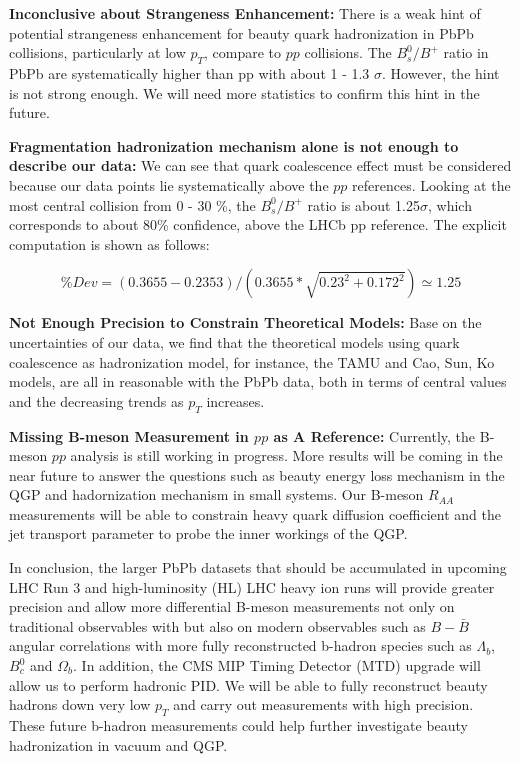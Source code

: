\textbf{Inconclusive about Strangeness Enhancement:} There is a weak hint of potential strangeness enhancement for beauty quark hadronization in PbPb collisions, particularly at low $p_T$, compare to $pp$ collisions. The $B^0_s/B^+$ ratio in PbPb are systematically higher than pp with about 1 - 1.3 $\sigma$. However, the hint is not strong enough. We will need more statistics to confirm this hint in the future.

\textbf{Fragmentation hadronization mechanism alone is not enough to describe our data:} We can see that quark coalescence effect must be considered because our data points lie systematically above the $pp$ references. Looking at the most central collision from 0 - 30 \%, the $B^0_s/B^+$ ratio is about 1.25$\sigma$, which corresponds to about 80\% confidence, above the LHCb pp reference. The explicit computation is shown as follows:

\begin{equation}
\% Dev = (0.3655 - 0.2353)/(0.3655 * \sqrt{0.23^2 + 0.172^2}) \simeq 1.25 
\end{equation}


\textbf{Not Enough Precision to Constrain Theoretical Models:} Base on the uncertainties of our data, we find that the theoretical models using quark coalescence as hadronization model, for instance, the TAMU and Cao, Sun, Ko models, are all in reasonable with the PbPb data, both in terms of central values and the decreasing trends as $p_T$ increases.

\textbf{Missing B-meson Measurement in $pp$ as A Reference:} Currently, the B-meson $pp$ analysis is still working in progress. More results will be coming in the near future to answer the questions such as beauty energy loss mechanism in the QGP and hadornization mechanism in small systems. Our B-meson $R_{AA}$ measurements will be able to constrain heavy quark diffusion coefficient and the jet transport parameter to probe the inner workings of the QGP.

In conclusion, the larger PbPb datasets that should be accumulated in upcoming LHC Run 3 and high-luminosity (HL) LHC heavy ion runs will provide greater precision and allow more differential B-meson measurements not only on traditional observables with but also on modern observables such as $B-\bar B$ angular correlations with more fully reconstructed b-hadron species such as $\Lambda_b$, $B^0_c$ and $\Omega_b$. In addition, the CMS MIP Timing Detector (MTD) upgrade \cite{CMSMTD} will allow us to perform hadronic PID. We will be able to fully reconstruct beauty hadrons down very low $p_T$ and carry out measurements with high precision. These future b-hadron measurements could help further investigate beauty hadronization in vacuum and QGP.


